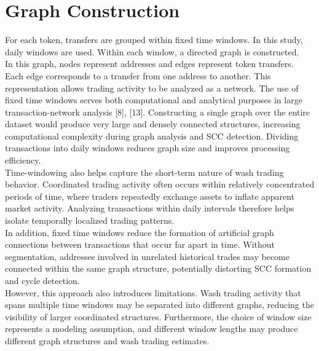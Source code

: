 \documentclass[language=english,thesis=bachelor,nosecondtitle,faculty=cb,onesided,12pt]{hsmw-thesis}
\begin{document}
	\section{Graph Construction}
For each token, transfers are grouped within fixed time windows. In this study, daily windows are used. Within each window, a directed graph is constructed. \\
In this graph, nodes represent addresses and edges represent token transfers. Each edge corresponds to a transfer from one address to another. This representation allows trading activity to be analyzed as a network.
The use of fixed time windows serves both computational and analytical purposes in large transaction-network analysis [8], [13]. Constructing a single graph over the entire dataset would produce very large and densely connected structures, increasing computational complexity during graph analysis and SCC detection. Dividing transactions into daily windows reduces graph size and improves processing efficiency.\\
Time-windowing also helps capture the short-term nature of wash trading behavior. Coordinated trading activity often occurs within relatively concentrated periods of time, where traders repeatedly exchange assets to inflate apparent market activity. Analyzing transactions within daily intervals therefore helps isolate temporally localized trading patterns.\\
In addition, fixed time windows reduce the formation of artificial graph connections between transactions that occur far apart in time. Without segmentation, addresses involved in unrelated historical trades may become connected within the same graph structure, potentially distorting SCC formation and cycle detection.\\
However, this approach also introduces limitations. Wash trading activity that spans multiple time windows may be separated into different graphs, reducing the visibility of larger coordinated structures. Furthermore, the choice of window size represents a modeling assumption, and different window lengths may produce different graph structures and wash trading estimates.\\
\end{document}
